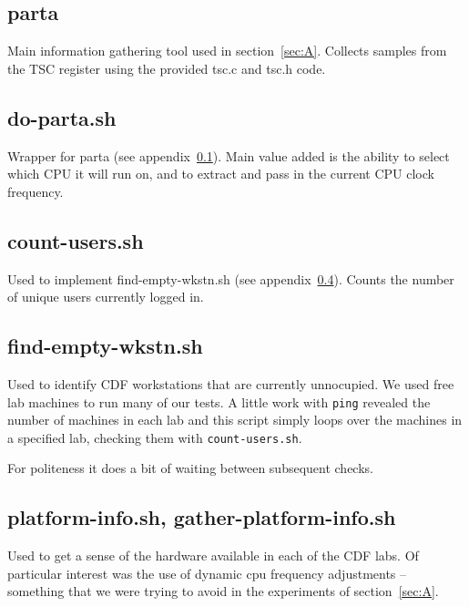 \documentclass{article}
\begin{document}
\subsection{parta} \label{tool:parta}
Main information gathering tool used in section~\ref{sec:A}. Collects samples
from the TSC register using the provided tsc.c and tsc.h code.
\begin{framed}
    \label{lst:parta}
    
\end{framed}

\subsection{do-parta.sh} \label{tool:do-parta}
Wrapper for parta (see appendix~\ref{tool:parta}). Main value added is the
ability to select which CPU it will run on, and to extract and pass in the
current CPU clock frequency.
\begin{framed}
    \label{lst:do-parta}
    
\end{framed}

\subsection{count-users.sh} \label{tool:count-users.sh}
Used to implement find-empty-wkstn.sh (see appendix~\ref{tool:find-empty}).
Counts the number of unique users currently logged in.

\subsection{find-empty-wkstn.sh} \label{tool:find-empty}
Used to identify CDF workstations that are currently unnocupied. We used free
lab machines to run many of our tests. A little work with \lstinline{ping}
revealed the number of machines in each lab and this script simply loops over
the machines in a specified lab, checking them with \lstinline{count-users.sh}.

For politeness it does a bit of waiting between subsequent checks.
\begin{framed}
    \label{lst:find-empty}
    
\end{framed}

\subsection{platform-info.sh, gather-platform-info.sh} \label{tool:platform}
Used to get a sense of the hardware available in each of the CDF labs. Of
particular interest was the use of dynamic cpu frequency adjustments --
something that we were trying to avoid in the experiments of
section~\ref{sec:A}.
\end{document}
